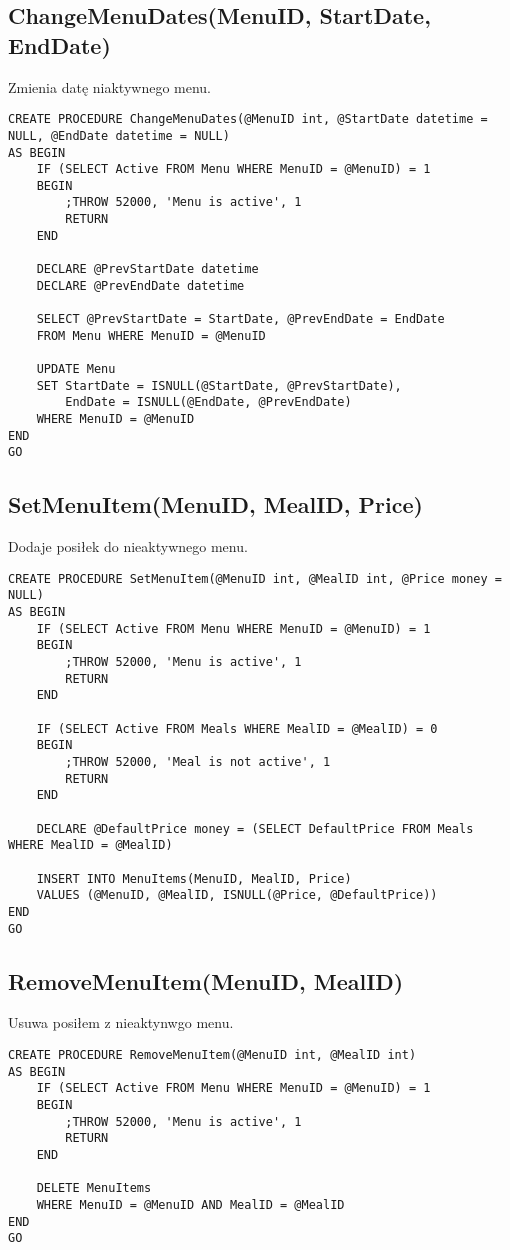 \subsection{ChangeMenuDates(MenuID, StartDate, EndDate)}
Zmienia datę niaktywnego menu.
\begin{verbatim}
CREATE PROCEDURE ChangeMenuDates(@MenuID int, @StartDate datetime = NULL, @EndDate datetime = NULL)
AS BEGIN
    IF (SELECT Active FROM Menu WHERE MenuID = @MenuID) = 1
    BEGIN
        ;THROW 52000, 'Menu is active', 1
        RETURN
    END 

    DECLARE @PrevStartDate datetime
    DECLARE @PrevEndDate datetime

    SELECT @PrevStartDate = StartDate, @PrevEndDate = EndDate 
    FROM Menu WHERE MenuID = @MenuID

    UPDATE Menu
    SET StartDate = ISNULL(@StartDate, @PrevStartDate),
        EndDate = ISNULL(@EndDate, @PrevEndDate)
    WHERE MenuID = @MenuID
END
GO
\end{verbatim}
\subsection{SetMenuItem(MenuID, MealID, Price)}
Dodaje posiłek do nieaktywnego menu.
\begin{verbatim}
CREATE PROCEDURE SetMenuItem(@MenuID int, @MealID int, @Price money = NULL)
AS BEGIN
    IF (SELECT Active FROM Menu WHERE MenuID = @MenuID) = 1
    BEGIN
        ;THROW 52000, 'Menu is active', 1
        RETURN
    END 

    IF (SELECT Active FROM Meals WHERE MealID = @MealID) = 0
    BEGIN
        ;THROW 52000, 'Meal is not active', 1
        RETURN
    END 

    DECLARE @DefaultPrice money = (SELECT DefaultPrice FROM Meals WHERE MealID = @MealID)

    INSERT INTO MenuItems(MenuID, MealID, Price)
    VALUES (@MenuID, @MealID, ISNULL(@Price, @DefaultPrice))
END
GO
\end{verbatim}
\subsection{RemoveMenuItem(MenuID, MealID)}
Usuwa posiłem z nieaktynwgo menu.
\begin{verbatim}
CREATE PROCEDURE RemoveMenuItem(@MenuID int, @MealID int)
AS BEGIN
    IF (SELECT Active FROM Menu WHERE MenuID = @MenuID) = 1
    BEGIN
        ;THROW 52000, 'Menu is active', 1
        RETURN
    END

    DELETE MenuItems
    WHERE MenuID = @MenuID AND MealID = @MealID
END
GO
\end{verbatim}
